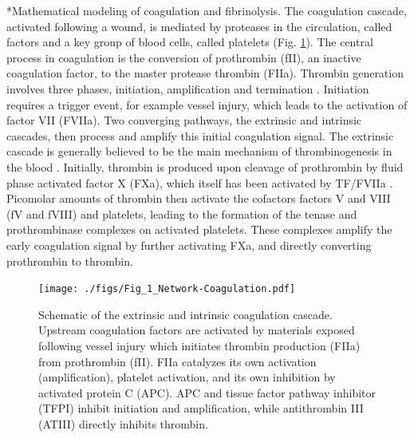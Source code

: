 \documentclass[12pt]{article}
\makeatletter
\renewcommand\subsection{\@startsection
	{subsection}{2}{0mm}
	{-0.05in}
	{-0.5\baselineskip}
	{\normalfont\normalsize\bfseries}}
\makeatother
\begin{document}
\subsection*{Mathematical modeling of coagulation and fibrinolysis.}
The coagulation cascade, activated following a wound,
is mediated by proteases in the circulation, called factors and a key group of blood cells, called platelets (Fig. \ref{fig:fig-coagulation}).
The central process in coagulation is the conversion of prothrombin (fII), an inactive coagulation factor, to the master protease thrombin (FIIa).
Thrombin generation involves three phases, initiation, amplification and termination \cite{GOLDHABER2006, Brummel:2002aa}.
Initiation requires a trigger event, for example vessel injury, which leads to the activation of factor VII (FVIIa).
Two converging pathways, the extrinsic and intrinsic cascades, then process and amplify this initial coagulation signal.
The extrinsic cascade is generally believed to be the main mechanism of thrombinogenesis in the blood \cite{MANN1990,ROBERTS1998,MANN1999}.
Initially, thrombin is produced upon cleavage of prothrombin by fluid phase activated factor X (FXa), which itself has been activated by TF/FVIIa \cite{Butenas:2002aa}.
Picomolar amounts of thrombin then activate the cofactors factors V and VIII (fV and fVIII) and platelets,
leading to the formation of the tenase and prothrombinase complexes on activated platelets.
These complexes amplify the early coagulation signal by further activating FXa, and directly converting prothrombin to thrombin.

\begin{figure}
  \texttt{[image: ./figs/Fig\_1\_Network-Coagulation.pdf]}
  \caption{Schematic of the extrinsic and intrinsic coagulation cascade.
  Upstream coagulation factors are activated by materials exposed following vessel injury which initiates thrombin production (FIIa) from prothrombin (fII).
  FIIa catalyzes its own activation (amplification), platelet activation, and its own inhibition by activated protein C (APC).
  APC and tissue factor pathway inhibitor (TFPI) inhibit initiation and amplification, while antithrombin III (ATIII) directly inhibits thrombin. }\label{fig:fig-coagulation}
\end{figure}
\end{document}
